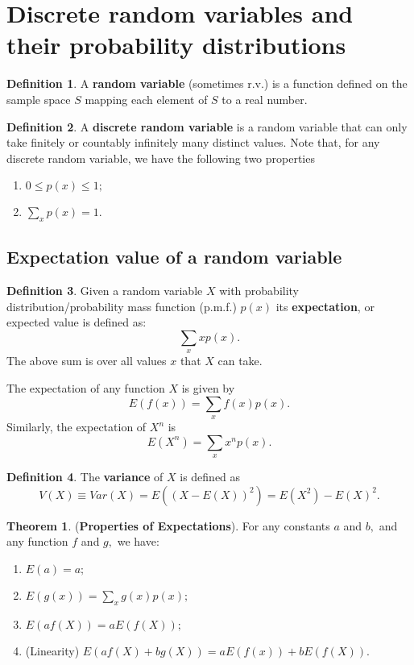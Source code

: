 \documentclass[12pt, a4paper]{article}
\theoremstyle{definition}
\newtheorem{definition}{Definition}[section]
\newtheorem{theorem}{Theorem}[section]
\theoremstyle{plain}
\begin{document}
\section{Discrete random variables and their probability distributions}

\begin{definition}
A \textbf{random variable} (sometimes r.v.) is a function defined on the sample space $S$ mapping each element of $S$ to a real number.
\end{definition}

\begin{definition}
A \textbf{discrete random variable} is a random variable that can only take finitely or countably infinitely many distinct values.
Note that, for any discrete random variable, we have the following two properties 
\begin{enumerate}
	
	\item $0 \leq p(x) \leq 1;$

	\item $\sum_{x}p(x)=1.$

\end{enumerate}
\end{definition}

\subsection{Expectation value of a random variable}

\begin{definition}
Given a random variable $X$ with probability distribution/probability mass function (p.m.f.) $p(x)$ its \textbf{expectation}, or expected value is defined as: $$\sum_{x}xp(x). $$ The above sum is over all values $x$ that $X$ can take.
\end{definition}

The expectation of any function $X$ is given by $$E(f(x))=\sum_{x}f(x)p(x).$$ Similarly, the expectation of $X^n$ is $$E(X^n)=\sum_{x}x^np(x).$$

\begin{definition}
The \textbf{variance} of $X$ is defined as $$V(X) \equiv Var(X) = E((X-E(X))^2) = E(X^2)-E(X)^2.$$
\end{definition}

\begin{theorem}
(\textbf{Properties of Expectations}). For any constants $a$ and $b,$ and any function $f$ and $g,$ we have:
\begin{enumerate}
	
	\item $E(a)=a;$

	\item $E(g(x))=\sum_{x} g(x)p(x);$

	\item $E(af(X))=aE(f(X));$

	\item (Linearity) $E(af(X)+bg(X)) = aE(f(x)) +bE(f(X))$.

\end{enumerate}
\end{theorem}
\end{document}
